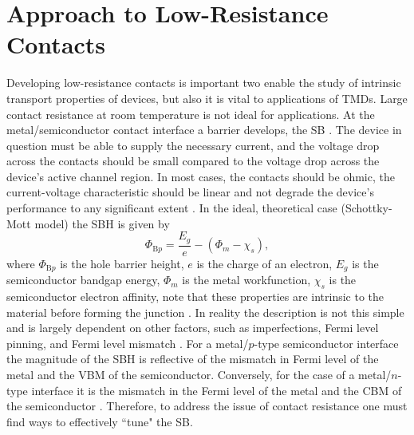 \section{Approach to Low-Resistance Contacts}\label{sec:contacts}
Developing low-resistance contacts is important two enable the study of intrinsic transport properties of devices, but also it is vital to applications of \acp{TMD}. Large contact resistance at room temperature is not ideal for applications. At the metal/semiconductor contact interface a barrier develops, the \acs{SB} \cite{Schottky_ZPhys1938}. The device in question must be able to supply the necessary current, and the voltage drop across the contacts should be small compared to the voltage drop across the device's active channel region. In most cases, the contacts should be ohmic, the current-voltage characteristic should be linear and not degrade the device's performance to any significant extent \cite{Rideout_Solid1975}. In the ideal, theoretical case (Schottky-Mott model)  the \acs{SBH} is given by 
\begin{equation}\label{eq:schottky_mott}
	\Phi_{\mathrm{B}p} = \frac{E_g}{e}- \left(\Phi_m - \chi_s\right),
\end{equation}
where $\Phi_{\mathrm{B}p}$ is the hole barrier height, $e$ is the charge of an electron, $E_g$ is the semiconductor bandgap energy, $\Phi_m$ is the metal workfunction, $\chi_s$ is the semiconductor electron affinity, note that these properties are intrinsic to the material before forming the junction \cite{Rhoderick_Book1988}. In reality the description is not this simple and is largely dependent on other factors, such as imperfections, Fermi level pinning, and Fermi level mismatch \cite{Cohen_Book2014}. For a metal/$p$-type semiconductor interface the magnitude of the \acs{SBH} is reflective of the mismatch in Fermi level of the metal and the \ac{VBM} of the semiconductor. Conversely, for the case of a metal/$n$-type interface it is the mismatch in the Fermi level of the metal and the \ac{CBM} of the semiconductor \cite{Tung_AppPhysRev2014}. Therefore, to address the issue of contact resistance one must find ways to effectively ``tune" the \acs{SB}.\\ \\

